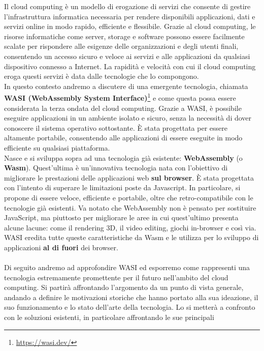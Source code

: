 Il cloud computing è un modello di erogazione di servizi che consente di gestire l'infrastruttura informatica necessaria
per rendere disponibili applicazioni, dati e servizi online in modo rapido, efficiente e flessibile. Grazie al cloud
computing, le risorse informatiche come server, storage e software possono essere facilmente scalate per rispondere alle
esigenze delle organizzazioni e degli utenti finali, consentendo un accesso sicuro e veloce ai servizi e alle
applicazioni da qualsiasi dispositivo connesso a Internet. La rapidità e velocità con cui il cloud computing eroga
questi servizi è data dalle tecnologie che lo compongono. \\
In questo contesto andremo a discutere di una emergente tecnologia, chiamata \textbf{WASI (WebAssembly System
Interface)}\footnote{\url{https://wasi.dev/}} e come questa possa essere considerata la terza ondata del cloud
computing\cite{cloudcomputing-thirdwave}. Grazie a WASI, è possibile eseguire applicazioni in un ambiente isolato e
sicuro, senza la necessità di dover conoscere il sistema operativo sottostante. È stata progettata per essere altamente
portabile, consentendo alle applicazioni di essere eseguite in modo efficiente su qualsiasi piattaforma. \\
Nasce e si sviluppa sopra ad una tecnologia già esistente: \textbf{WebAssembly} (o \textbf{Wasm}). Quest'ultima è
un'innovativa tecnologia nata con l'obiettivo di migliorare le prestazioni delle applicazioni web \textbf{sul browser}.
È stata progettata con l'intento di superare le limitazioni poste da Javascript. In particolare, si propone di essere
veloce, efficiente e portabile, oltre che retro-compatibile con le tecnologie già esistenti. Va notato che WebAssembly
non è pensato per sostituire JavaScript, ma piuttosto per migliorare le aree in cui quest'ultimo presenta alcune lacune:
come il rendering 3D, il video editing, giochi in-browser e così via. \\
WASI eredita tutte queste caratteristiche da Wasm e le utilizza per lo sviluppo di applicazioni \textbf{al di fuori} dei
browser. \\\\
Di seguito andremo ad approfondire WASI ed esporremo come rappresenti una tecnologia estremamente promettente per il
futuro nell'ambito del cloud computing. Si partirà affrontando l'argomento da un punto di vista generale, andando a
definire le motivazioni storiche che hanno portato alla sua ideazione, il suo funzionamento e lo stato dell'arte della
tecnologia. Lo si metterà a confronto con le soluzioni esistenti, in particolare affrontando le sue principali
